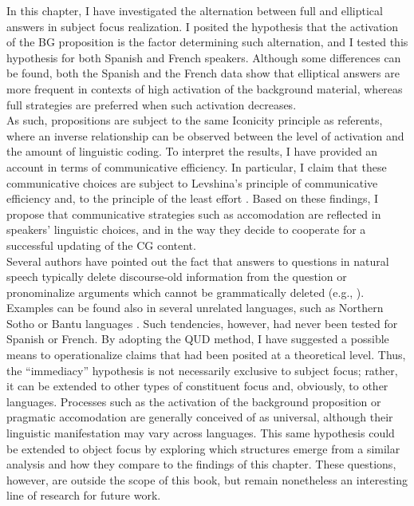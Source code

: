 In this chapter, I have investigated the alternation between full and elliptical answers in subject focus realization. I posited the hypothesis that the activation of the BG proposition is the factor determining such alternation, and I tested this hypothesis for both Spanish and French speakers. Although some differences can be found, both the Spanish and the French data show that elliptical answers are more frequent in contexts of high activation of the background material, whereas full strategies are preferred when such activation decreases.\\
As such, propositions are subject to the same Iconicity principle \parencite{chiarcos2011mental} as referents, where an inverse relationship can be observed between the level of activation and the amount of linguistic coding.
To interpret the results, I have provided an account in terms of communicative efficiency. In particular, I claim that these communicative choices are subject to Levshina's principle of communicative efficiency \parencite{Levshina_2022} and, to the principle of the least effort \parencite{zipf1949human}. Based on these findings, I propose that communicative strategies such as accomodation are reflected in speakers' linguistic choices, and in the way they decide to cooperate for a successful updating of the CG content.\\
Several authors have pointed out the fact that answers to questions in natural speech typically delete discourse-old information from  the question or pronominalize arguments which cannot be grammatically deleted (e.g., \cite{krifka2008basic}). Examples can be found also in several unrelated languages, such as Northern Sotho \parencite{zerbian2007investigating} or Bantu languages \parencite{downing2016information}. Such tendencies, however, had never been tested for Spanish or French. By adopting the QUD method, I have suggested a possible means to operationalize claims that had been posited at a theoretical level. Thus, the ``immediacy” hypothesis is not necessarily exclusive to subject focus; rather, it can be extended to other types of constituent focus and, obviously, to other languages. Processes such as the activation of the background proposition or pragmatic accomodation are generally conceived of as universal, although their linguistic manifestation may vary across languages. This same hypothesis could be extended to object focus by exploring which structures emerge from a similar analysis and how they compare to the findings of this chapter. These questions, however, are outside the scope of this book, but remain nonetheless an interesting line of research for future work.\\
